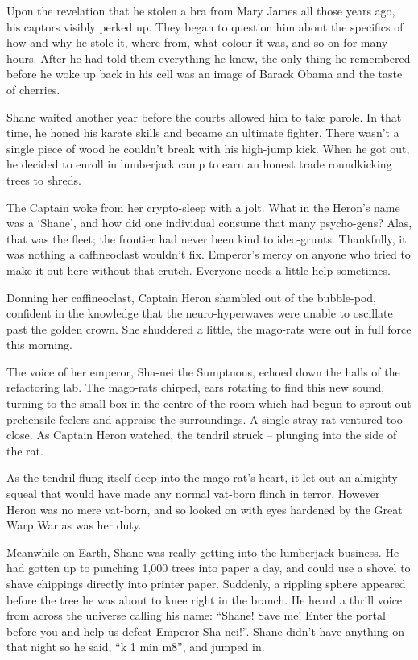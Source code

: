 Upon the revelation that he stolen a bra from Mary James all those years ago, his captors visibly perked up. They began to question him about the specifics of how and why he stole it, where from, what colour it was, and so on for many hours. After he had told them everything he knew, the only thing he remembered before he woke up back in his cell was an image of Barack Obama and the taste of cherries.

Shane waited another year before the courts allowed him to take parole. In that time, he honed his karate skills and became an ultimate fighter. There wasn’t a single piece of wood he couldn’t break with his high-jump kick. When he got out, he decided to enroll in lumberjack camp to earn an honest trade roundkicking trees to shreds.

The Captain woke from her crypto-sleep with a jolt. What in the Heron’s name was a ‘Shane’, and how did one individual consume that many psycho-gens? Alas, that was the fleet; the frontier had never been kind to ideo-grunts. Thankfully, it was nothing a caffineoclast wouldn’t fix. Emperor’s mercy on anyone who tried to make it out here without that crutch. Everyone needs a little help sometimes. 

Donning her caffineoclast, Captain Heron shambled out of the bubble-pod, confident in the knowledge that the neuro-hyperwaves were unable to oscillate past the golden crown. She shuddered a little, the mago-rats were out in full force this morning.

The voice of her emperor, Sha-nei the Sumptuous, echoed down the halls of the refactoring lab. The mago-rats chirped, ears rotating to find this new sound, turning to the small box in the centre of the room which had begun to sprout out prehensile feelers and appraise the surroundings.  A single stray rat ventured too close. As Captain Heron watched, the tendril struck – plunging into the side of the rat.

As the tendril flung itself deep into the mago-rat’s heart, it let out an almighty squeal that would have made any normal vat-born flinch in terror. However Heron was no mere vat-born, and so looked on with eyes hardened by the Great Warp War as was her duty.

Meanwhile on Earth, Shane was really getting into the lumberjack business. He had gotten up to punching 1,000 trees into paper a day, and could use a shovel to shave chippings directly into printer paper. Suddenly, a rippling sphere appeared before the tree he was about to knee right in the branch. He heard a thrill voice from across the universe calling his name: ``Shane! Save me! Enter the portal before you and help us defeat Emperor Sha-nei!''. Shane didn’t have anything on that night so he said, ``k 1 min m8'', and jumped in.

